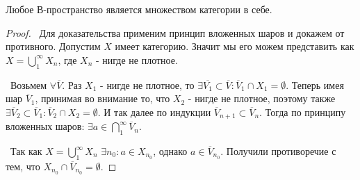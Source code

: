 \begin{theorem*}
Любое В-пространство является множеством  категории в себе. 
\end{theorem*}
\begin{proof}
\smallskip
\par\noindent \textbullet~Для доказательства применим принцип вложенных шаров и докажем от противного. Допустим $X$ имеет  категорию. Значит мы его 
можем представить как $X = \bigcup\limits_1^\infty X_n$, где $X_n$ - нигде не плотное. 

\noindent \textbullet~Возьмем $\forall \overline{V}$. Раз $X_1$ - нигде не плотное, то $\exists \overline{V_1} \subset \overline{V} : \overline{V}_1 \cap X_1 = \emptyset$.
Теперь имея шар $\overline{V}_1$, принимая во внимание то, что $X_2$ - нигде не плотное, поэтому также $\exists \overline{V}_2 \subset \overline{V}_1 : \overline{V}_2 
\cap X_2 = \emptyset$. И так далее по индукции $\overline{V}_{n + 1} \subset \overline{V}_n$. Тогда по принципу вложенных шаров: $\exists a \in \bigcap\limits_1^\infty 
\overline{V}_n$.

\noindent \textbullet~Так как $X = \bigcup\limits_1^\infty X_n$ $\exists n_0 : a \in X_{n_0}$, однако $a \in \overline{V}_{n_0}$. Получили противоречие с тем, что $X_{n_0} \cap 
\overline{V}_{n_0} = \emptyset$.
\end{proof}
